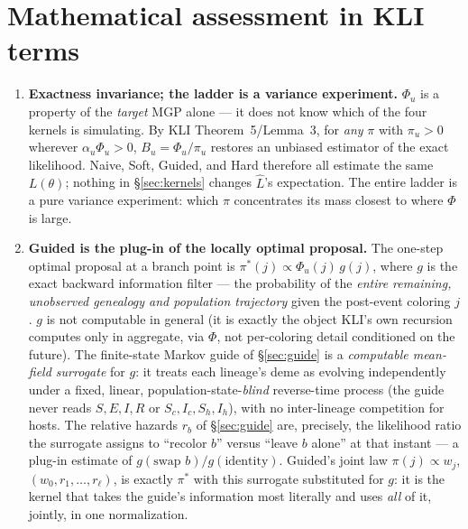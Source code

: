 \documentclass[11pt]{article}
\theoremstyle{plain}
\begin{document}
\section{Mathematical assessment in KLI terms}
\label{sec:assessment}

\begin{enumerate}

\item[(i)] \textbf{Exactness invariance; the ladder is a variance experiment.} $\Phi_u$ is a
property of the \emph{target} MGP alone --- it does not know which of the four kernels is
simulating. By KLI Theorem~5/Lemma~3, for \emph{any} $\pi$ with $\pi_u>0$ wherever
$\alpha_u\Phi_u>0$, $B_u=\Phi_u/\pi_u$ restores an unbiased estimator of the exact likelihood.
Naive, Soft, Guided, and Hard therefore all estimate the same $L(\theta)$; nothing in
\S\ref{sec:kernels} changes $\hat L$'s expectation. The entire ladder is a pure variance
experiment: which $\pi$ concentrates its mass closest to where $\Phi$ is large.

\item[(ii)] \textbf{Guided is the plug-in of the locally optimal proposal.} The one-step optimal
proposal at a branch point is $\pi^*(j)\propto\Phi_u(j)\,g(j)$, where $g$ is the exact backward
information filter --- the probability of the \emph{entire remaining, unobserved genealogy and
population trajectory} given the post-event coloring $j$. $g$ is not computable in general (it is
exactly the object KLI's own recursion computes only in aggregate, via $\Phi$, not per-coloring
detail conditioned on the future). The finite-state Markov guide of \S\ref{sec:guide} is a
\emph{computable mean-field surrogate} for $g$: it treats each lineage's deme as evolving
independently under a fixed, linear, population-state-\emph{blind} reverse-time process (the guide
never reads $S,E,I,R$ or $S_c,I_c,S_h,I_h$), with no inter-lineage competition for hosts. The
relative hazards $r_b$ of \S\ref{sec:guide} are, precisely, the likelihood ratio the surrogate
assigns to ``recolor $b$'' versus ``leave $b$ alone'' at that instant --- a plug-in estimate of
$g(\text{swap }b)/g(\text{identity})$. Guided's joint law $\pi(j)\propto w_j$,
$(w_0,r_1,\ldots,r_\ell)$, is exactly $\pi^*$ with this surrogate substituted for $g$: it is the
kernel that takes the guide's information most literally and uses \emph{all} of it, jointly, in one
normalization.


\end{enumerate}
\end{document}
